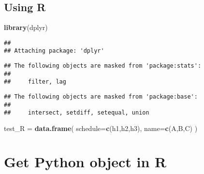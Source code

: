 \documentclass[
]{article}
\newenvironment{Shaded}{\begin{snugshade}}{\end{snugshade}}
\newcommand{\KeywordTok}[1]{\textcolor[rgb]{0.13,0.29,0.53}{\textbf{#1}}}
\newcommand{\NormalTok}[1]{#1}
\newcommand{\OperatorTok}[1]{\textcolor[rgb]{0.81,0.36,0.00}{\textbf{#1}}}
\newcommand{\StringTok}[1]{\textcolor[rgb]{0.31,0.60,0.02}{#1}}
\begin{document}
\hypertarget{using-r}{%
\subsection{Using R}\label{using-r}}

\begin{Shaded}
\begin{Highlighting}[]
\KeywordTok{library}\NormalTok{(dplyr)}
\end{Highlighting}
\end{Shaded}

\begin{verbatim}
## 
## Attaching package: 'dplyr'
\end{verbatim}

\begin{verbatim}
## The following objects are masked from 'package:stats':
## 
##     filter, lag
\end{verbatim}

\begin{verbatim}
## The following objects are masked from 'package:base':
## 
##     intersect, setdiff, setequal, union
\end{verbatim}

\begin{Shaded}
\begin{Highlighting}[]
\NormalTok{test\_R =}\StringTok{ }\KeywordTok{data.frame}\NormalTok{(}
  \StringTok{\textquotesingle{}schedule\textquotesingle{}}\NormalTok{=}\KeywordTok{c}\NormalTok{(}\StringTok{\textquotesingle{}h1\textquotesingle{}}\NormalTok{,}\StringTok{\textquotesingle{}h2\textquotesingle{}}\NormalTok{,}\StringTok{\textquotesingle{}h3\textquotesingle{}}\NormalTok{),}
  \StringTok{\textquotesingle{}name\textquotesingle{}}\NormalTok{=}\KeywordTok{c}\NormalTok{(}\StringTok{\textquotesingle{}A\textquotesingle{}}\NormalTok{,}\StringTok{\textquotesingle{}B\textquotesingle{}}\NormalTok{,}\StringTok{\textquotesingle{}C\textquotesingle{}}\NormalTok{)}
\NormalTok{  )}
\end{Highlighting}
\end{Shaded}

\hypertarget{get-python-object-in-r}{%
\section{Get Python object in R}\label{get-python-object-in-r}}

\begin{Shaded}
\end{Shaded}
\end{document}
